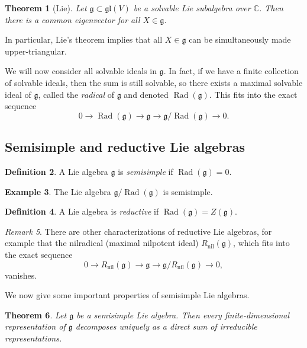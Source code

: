 \documentclass{amsart}
\newtheorem{thm}{Theorem}[section]
\theoremstyle{definition}
\newtheorem{defn}[thm]{Definition}
\newtheorem{exm}[thm]{Example}
\theoremstyle{remark}
\newtheorem{rmk}[thm]{Remark}
\theoremstyle{plain}
\theoremstyle{definition}
\theoremstyle{remark}
\newcommand{\C}{\mathbb{C}}
\newcommand{\g}{\mathfrak{g}}
\newcommand{\mf}[1]{\mathfrak{#1}}
\newcommand{\on}[1]{\operatorname{#1}}
\newcommand{\1}{\mathbf{1}}
\newcommand{\2}{\mathbf{2}}
\newcommand{\3}{\mathbf{3}}
\newcommand{\gl}{\mf{gl}}
\begin{document}
\begin{thm}[Lie]
    Let \(\g \subset \gl(V)\) be a solvable Lie subalgebra over \(\C\). Then there is a common eigenvector for all \(X \in \g\).
\end{thm}

In particular, Lie's theorem implies that all \(X \in \g\) can be simultaneously made upper-triangular.

We will now consider all solvable ideals in \(\g\). In fact, if we have a finite collection of solvable ideals, then the sum is still solvable, so there exists a maximal solvable ideal of \(\g\), called the \textit{radical} of \(\g\) and denoted \(\on{Rad}(\g)\). This fits into the exact sequence
\[ 0 \to \on{Rad}(\g) \to \g \to \g/\on{Rad}(\g) \to 0. \]


\subsection{Semisimple and reductive Lie algebras}%
\label{sub:Semisimple and reductive Lie algebras}

\begin{defn}
    A Lie algebra \(\g\) is \textit{semisimple} if \(\on{Rad}(\g) = 0\).
\end{defn}

\begin{exm}
    The Lie algebra \(\g / \on{Rad}(\g)\) is semisimple.
\end{exm}

\begin{defn}
    A Lie algebra is \textit{reductive} if \(\on{Rad}(\g) = Z(\g)\).
\end{defn}

\begin{rmk}
    There are other characterizations of reductive Lie algebras, for example that the nilradical (maximal nilpotent ideal) \(R_{\on{nil}}(\g)\), which fits into the exact sequence
    \[ 0 \to R_{\on{nil}}(\g) \to \g \to \g/R_{\on{nil}}(\g) \to 0, \]
    vanishes.
\end{rmk}

We now give some important properties of semisimple Lie algebras.
\begin{thm}
    Let \(\g\) be a semisimple Lie algebra. Then every finite-dimensional representation of \(\g\) decomposes uniquely as a direct sum of irreducible representations.
\end{thm}
\end{document}
